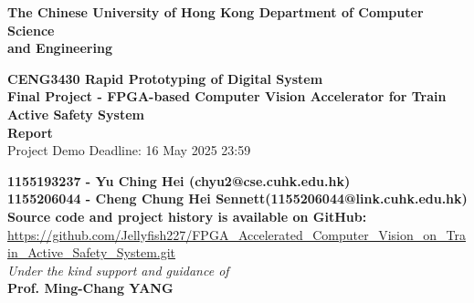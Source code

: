 \documentclass[12pt, a4paper]{article}
\begin{document}
  

\begin{titlepage}
    \begin{center}

		\bf\LARGE{The Chinese University of Hong Kong}
        \bf\Large{Department of Computer Science\\and Engineering}
		
		\vspace{80pt}
		
		\vspace{15pt}
		\textbf{\Large CENG3430 Rapid Prototyping of Digital System\\}
		\vspace{10pt}
		\textbf{\Large Final Project - FPGA-based Computer Vision Accelerator for Train Active Safety System}\\
		\vspace{10pt}
		\textbf{\Large Report}\\
        \vspace{6pt}
        {\large Project Demo Deadline: 16 May 2025 23:59}
		\vspace{40pt}
		
        \vspace{15pt}
		\textbf{\normalsize
            1155193237 - Yu Ching Hei (chyu2@cse.cuhk.edu.hk)\\
            1155206044 - Cheng Chung Hei Sennett(1155206044@link.cuhk.edu.hk)\\
        }
		\vspace{40pt}
        \textbf{\large Source code and project history is available on GitHub:}\\
        \normalsize \url{https://github.com/Jellyfish227/FPGA_Accelerated_Computer_Vision_on_Train_Active_Safety_System.git}\\
        \vspace{60pt}
		\textit{Under the kind support and guidance of}\\
		\textbf{\large Prof. Ming-Chang YANG}\\
		\vspace{20pt}
		
	\end{center}
\end{titlepage}
\end{document}
